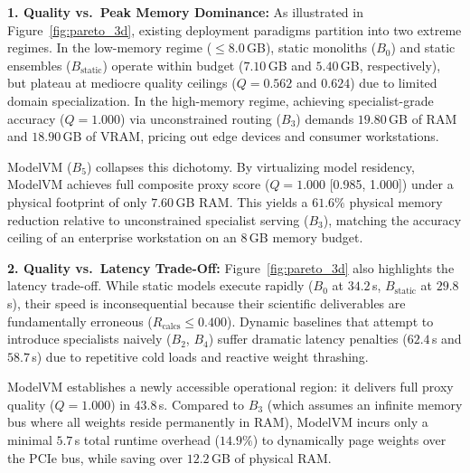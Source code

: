 \textbf{1. Quality vs.\ Peak Memory Dominance:} As illustrated in Figure~\ref{fig:pareto_3d}, existing deployment paradigms partition into two extreme regimes. In the low-memory regime ($\le 8.0$\,GB), static monoliths ($B_0$) and static ensembles ($B_{\text{static}}$) operate within budget ($7.10$\,GB and $5.40$\,GB, respectively), but plateau at mediocre quality ceilings ($Q = 0.562$ and $0.624$) due to limited domain specialization. In the high-memory regime, achieving specialist-grade accuracy ($Q = 1.000$) via unconstrained routing ($B_3$) demands $19.80$\,GB of RAM and $18.90$\,GB of VRAM, pricing out edge devices and consumer workstations. 

ModelVM ($B_5$) collapses this dichotomy. By virtualizing model residency, ModelVM achieves full composite proxy score ($Q = 1.000$ [0.985, 1.000]) under a physical footprint of only $7.60$\,GB RAM. This yields a $61.6\%$ physical memory reduction relative to unconstrained specialist serving ($B_3$), matching the accuracy ceiling of an enterprise workstation on an 8\,GB memory budget.

\textbf{2. Quality vs.\ Latency Trade-Off:} Figure~\ref{fig:pareto_3d} also highlights the latency trade-off. While static models execute rapidly ($B_0$ at $34.2$\,s, $B_{\text{static}}$ at $29.8$\,s), their speed is inconsequential because their scientific deliverables are fundamentally erroneous ($R_{\text{calcs}} \le 0.400$). Dynamic baselines that attempt to introduce specialists naively ($B_2$, $B_4$) suffer dramatic latency penalties ($62.4$\,s and $58.7$\,s) due to repetitive cold loads and reactive weight thrashing. 

ModelVM establishes a newly accessible operational region: it delivers full proxy quality ($Q = 1.000$) in $43.8$\,s. Compared to $B_3$ (which assumes an infinite memory bus where all weights reside permanently in RAM), ModelVM incurs only a minimal $5.7$\,s total runtime overhead ($14.9\%$) to dynamically page weights over the PCIe bus, while saving over $12.2$\,GB of physical RAM.

